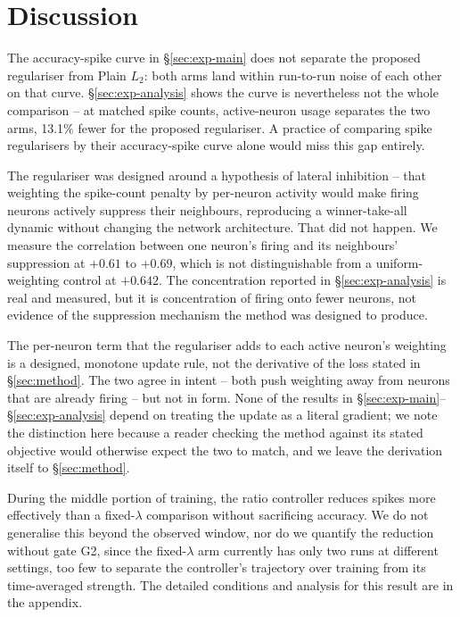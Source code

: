 \section{Discussion}
\label{sec:discussion}

The accuracy-spike curve in \S\ref{sec:exp-main} does not separate the proposed
regulariser from Plain $L_2$: both arms land within run-to-run noise of each other
on that curve. \S\ref{sec:exp-analysis} shows the curve is nevertheless not the
whole comparison -- at matched spike counts, active-neuron usage separates the
two arms, 13.1\% fewer for the proposed regulariser. A practice of
comparing spike regularisers by their accuracy-spike curve alone would miss this
gap entirely.

The regulariser was designed around a hypothesis of lateral inhibition -- that
weighting the spike-count penalty by per-neuron activity would make firing
neurons actively suppress their neighbours, reproducing a winner-take-all
dynamic without changing the network architecture. That did not happen. We
measure the correlation between one neuron's firing and its neighbours'
suppression at $+0.61$ to $+0.69$, which is not distinguishable from a
uniform-weighting control at $+0.642$. The concentration reported in
\S\ref{sec:exp-analysis} is real and measured, but it is concentration of
firing onto fewer neurons, not evidence of the suppression mechanism the
method was designed to produce.

The per-neuron term that the regulariser adds to each active neuron's
weighting is a designed, monotone update rule, not the derivative of the loss
stated in \S\ref{sec:method}. The two agree in intent -- both push weighting
away from neurons that are already firing -- but not in form. None of the
results in \S\ref{sec:exp-main}--\S\ref{sec:exp-analysis} depend on treating
the update as a literal gradient; we note the distinction here because a
reader checking the method against its stated objective would otherwise
expect the two to match, and we leave the derivation itself to
\S\ref{sec:method}.

During the middle portion of training, the ratio controller reduces spikes more effectively than
a fixed-$\lambda$ comparison without sacrificing accuracy. We do not generalise this beyond the observed window, nor do we quantify the reduction without gate G2,
since the fixed-$\lambda$ arm currently has only two runs at different settings,
too few to separate the controller's trajectory over training from its time-averaged strength.
The detailed conditions and analysis for this result are in the appendix.

